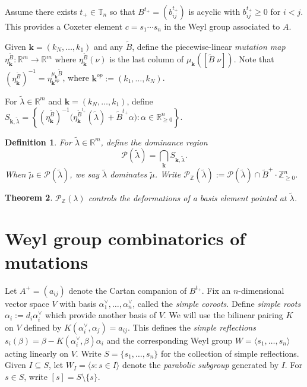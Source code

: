 \documentclass{amsart}
\newtheorem{theorem}{Theorem}
\newtheorem{definition}[theorem]{Definition}
\numberwithin{theorem}{section}
\newcommand{\bfk}{{\boldsymbol{k}}}
\newcommand{\cP}{\mathcal{P}}
\newcommand{\RR}{\mathbb{R}}
\newcommand{\TT}{\mathbb{T}}
\newcommand{\ZZ}{\mathbb{Z}}
\begin{document}
  Assume there exists $t_+\in\TT_n$ so that $B^{t_+}=(b^{t_+}_{ij})$ is acyclic with $b^{t_+}_{ij}\ge 0$ for $i<j$.
  This provides a Coxeter element $c=s_1\cdots s_n$ in the Weyl group associated to $A$.
  
  Given $\bfk=(k_N,\ldots,k_1)$ and any $\widetilde B$, define the piecewise-linear \emph{mutation map} $\eta^{\widetilde B}_\bfk:\RR^m\to\RR^m$ where $\eta^{\widetilde B}_\bfk(\nu)$ is the last column of $\mu_\bfk([\widetilde{B}\;\nu])$.
  Note that $\left(\eta^{\widetilde{B}}_\bfk\right)^{-1}=\eta^{\mu_\bfk\widetilde{B}}_{\bfk^{op}}$, where $\bfk^{op}:=(k_1,\ldots,k_N)$.

  For $\widetilde\lambda\in\RR^m$ and $\bfk=(k_N,\ldots,k_1)$, define $S_{\bfk,\widetilde\lambda}=\left\{\left(\eta^{\widetilde{B}}_\bfk\right)^{-1}\big(\eta^{\widetilde B^{t_+}}_\bfk(\widetilde\lambda)+\widetilde{B}^{t_+}\alpha\big):\alpha\in\RR^n_{\ge0}\right\}$.
  
  \begin{definition}
    For $\widetilde\lambda\in\RR^m$, define the \emph{dominance region} 
    \[
      \cP(\widetilde\lambda) = \bigcap_\bfk S_{\bfk,\widetilde\lambda}.
    \]
    When $\widetilde\mu\in\cP(\widetilde\lambda)$, we say \emph{$\widetilde\lambda$ dominates $\widetilde\mu$}.
    Write $\cP_\ZZ(\widetilde\lambda):=\cP(\widetilde\lambda)\cap \widetilde B^+ \cdot \ZZ_{\ge0}^n$. 
  \end{definition}

  \begin{theorem}
    \cite{qin}
    $\cP_\ZZ(\lambda)$ controls the deformations of a basis element pointed at $\widetilde\lambda$.
  \end{theorem}


  \section{Weyl group combinatorics of mutations}
  Let $A^+=(a_{ij})$ denote the Cartan companion of $B^{t_+}$.
  Fix an $n$-dimensional vector space $V$ with basis $\alpha^\vee_1,\ldots,\alpha^\vee_n$, called the \emph{simple coroots}.
  Define \emph{simple roots} $\alpha_i:=d_i\alpha^\vee_i$ which provide another basis of $V$.
  We will use the bilinear pairing $K$ on $V$ defined by $K(\alpha^\vee_i,\alpha_j)=a_{ij}$.
  This defines the \emph{simple reflections} $s_i(\beta)=\beta-K(\alpha^\vee_i,\beta)\alpha_i$ and the corresponding Weyl group $W=\langle s_1,\ldots,s_n\rangle$ acting linearly on $V$.
  Write $S=\{s_1,\ldots,s_n\}$ for the collection of simple reflections.
  Given $I\subseteq S$, let $W_I=\langle s:s\in I\rangle$ denote the \emph{parabolic subgroup} generated by $I$.
  For $s\in S$, write $[s]=S\setminus\{s\}$.
\end{document}
